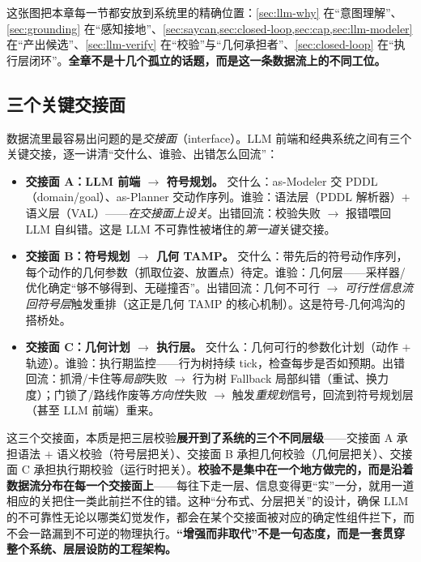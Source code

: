 \noindent 这张图把本章每一节都安放到系统里的精确位置：\cref{sec:llm-why} 在“意图理解”、\cref{sec:grounding} 在“感知接地”、\cref{sec:saycan,sec:closed-loop,sec:cap,sec:llm-modeler} 在“产出候选”、\cref{sec:llm-verify} 在“校验”与“几何承担者”、\cref{sec:closed-loop} 在“执行层闭环”。\textbf{全章不是十几个孤立的话题，而是这一条数据流上的不同工位。}

\subsection{三个关键交接面}
\label{sec:interfaces}

数据流里最容易出问题的是\emph{交接面}（interface）。LLM 前端和经典系统之间有三个关键交接，逐一讲清“交什么、谁验、出错怎么回流”：

\begin{itemize}
  \item \textbf{交接面 A：LLM 前端 $\to$ 符号规划。} 交什么：as-Modeler 交 PDDL（domain/goal）、as-Planner 交动作序列。谁验：语法层（PDDL 解析器）$+$ 语义层（VAL）——\emph{在交接面上设关}。出错回流：校验失败 $\to$ 报错喂回 LLM 自纠错。这是 LLM 不可靠性被堵住的\emph{第一道}关键交接。
  \item \textbf{交接面 B：符号规划 $\to$ 几何 TAMP。} 交什么：带先后的符号动作序列，每个动作的几何参数（抓取位姿、放置点）待定。谁验：几何层——采样器/优化确定“够不够得到、无碰撞否”。出错回流：几何不可行 $\to$ \emph{可行性信息流回符号层}触发重排（这正是几何 TAMP 的核心机制）。这是符号-几何鸿沟的搭桥处。
  \item \textbf{交接面 C：几何计划 $\to$ 执行层。} 交什么：几何可行的参数化计划（动作 $+$ 轨迹）。谁验：执行期监控——行为树持续 tick，检查每步是否如预期。出错回流：抓滑/卡住等\emph{局部}失败 $\to$ 行为树 Fallback 局部纠错（重试、换力度）；门锁了/路线作废等\emph{方向性}失败 $\to$ 触发\emph{重规划}信号，回流到符号规划层（甚至 LLM 前端）重来。
\end{itemize}

\begin{insight}[校验沿数据流分布在每一个交接面]
这三个交接面，本质是把三层校验\textbf{展开到了系统的三个不同层级}——交接面 A 承担语法 $+$ 语义校验（符号层把关）、交接面 B 承担几何校验（几何层把关）、交接面 C 承担执行期校验（运行时把关）。\textbf{校验不是集中在一个地方做完的，而是沿着数据流分布在每一个交接面上}——每往下走一层、信息变得更“实”一分，就用一道相应的关把住一类此前拦不住的错。这种“分布式、分层把关”的设计，确保 LLM 的不可靠性无论以哪类幻觉发作，都会在某个交接面被对应的确定性组件拦下，而不会一路漏到不可逆的物理执行。\textbf{“增强而非取代”不是一句态度，而是一套贯穿整个系统、层层设防的工程架构。}
\end{insight}

